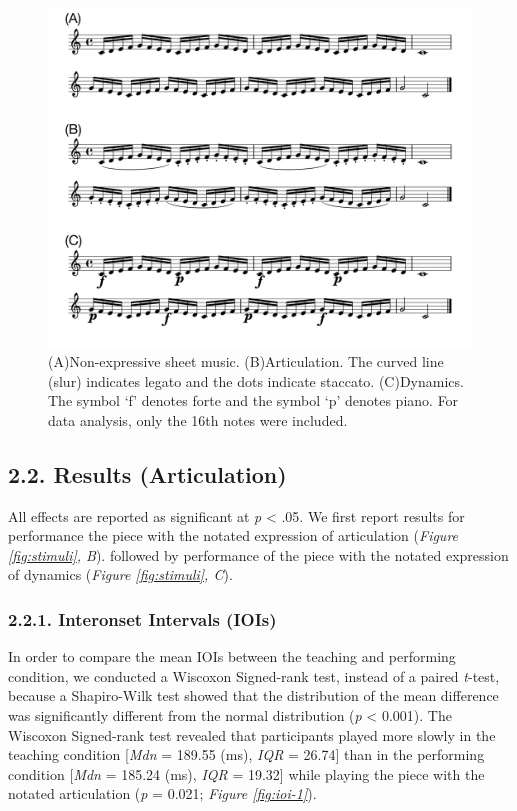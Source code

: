 \documentclass[
  english,
  man,floatsintext]{apa6}
\begin{document}
\begin{figure}
\includegraphics[width=1\linewidth]{manuscript_files/figure-latex/stim-1-1} \caption{\label{fig:stimuli}(A)Non-expressive sheet music. (B)Articulation. The curved line (slur) indicates legato and the dots indicate staccato. (C)Dynamics. The symbol `f' denotes forte and the symbol `p' denotes piano. For data analysis, only the 16th notes were included.}\label{fig:stim-1}
\end{figure}

\newpage

\hypertarget{results-articulation}{%
\subsection{2.2. Results (Articulation)}\label{results-articulation}}

All effects are reported as significant at \emph{p} \textless{} .05. We first report results for performance the piece with the notated expression of articulation (\emph{Figure \ref{fig:stimuli}, B}). followed by performance of the piece with the notated expression of dynamics (\emph{Figure \ref{fig:stimuli}, C}).

\hypertarget{interonset-intervals-iois}{%
\subsubsection{2.2.1. Interonset Intervals (IOIs)}\label{interonset-intervals-iois}}

In order to compare the mean IOIs between the teaching and performing condition, we conducted a Wiscoxon Signed-rank test, instead of a paired \emph{t}-test, because a Shapiro-Wilk test showed that the distribution of the mean difference was significantly different from the normal distribution (\emph{p} \textless{} 0.001). The Wiscoxon Signed-rank test revealed that participants played more slowly in the teaching condition {[}\emph{Mdn} = 189.55 (ms), \emph{IQR} = 26.74{]} than in the performing condition {[}\emph{Mdn} = 185.24 (ms), \emph{IQR} = 19.32{]} while playing the piece with the notated articulation (\emph{p} = 0.021; \emph{Figure \ref{fig:ioi-1}}).
\end{document}
